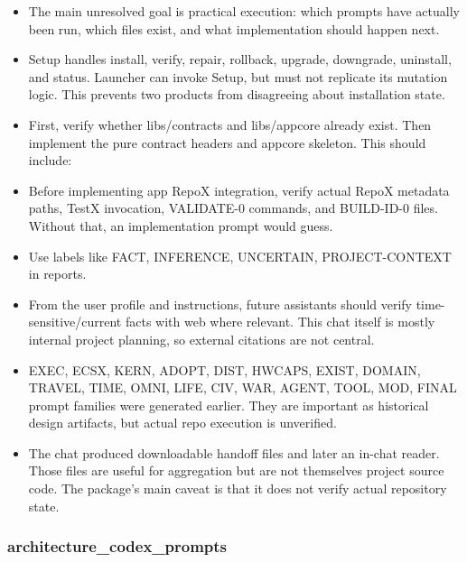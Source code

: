 \documentclass[11pt,a4paper]{report}
\begin{document}
\begin{itemize}
\item The main unresolved goal is practical execution: which prompts have actually been run, which files exist, and what implementation should happen next.
\item Setup handles install, verify, repair, rollback, upgrade, downgrade, uninstall, and status. Launcher can invoke Setup, but must not replicate its mutation logic. This prevents two products from disagreeing about installation state.
\item First, verify whether libs/contracts and libs/appcore already exist. Then implement the pure contract headers and appcore skeleton. This should include:
\item Before implementing app RepoX integration, verify actual RepoX metadata paths, TestX invocation, VALIDATE-0 commands, and BUILD-ID-0 files. Without that, an implementation prompt would guess.
\item Use labels like FACT, INFERENCE, UNCERTAIN, PROJECT-CONTEXT in reports.
\item From the user profile and instructions, future assistants should verify time-sensitive/current facts with web where relevant. This chat itself is mostly internal project planning, so external citations are not central.
\item EXEC, ECSX, KERN, ADOPT, DIST, HWCAPS, EXIST, DOMAIN, TRAVEL, TIME, OMNI, LIFE, CIV, WAR, AGENT, TOOL, MOD, FINAL prompt families were generated earlier. They are important as historical design artifacts, but actual repo execution is unverified.
\item The chat produced downloadable handoff files and later an in-chat reader. Those files are useful for aggregation but are not themselves project source code. The package's main caveat is that it does not verify actual repository state.
\end{itemize}

\subsubsection{architecture\_codex\_prompts}
\end{document}
